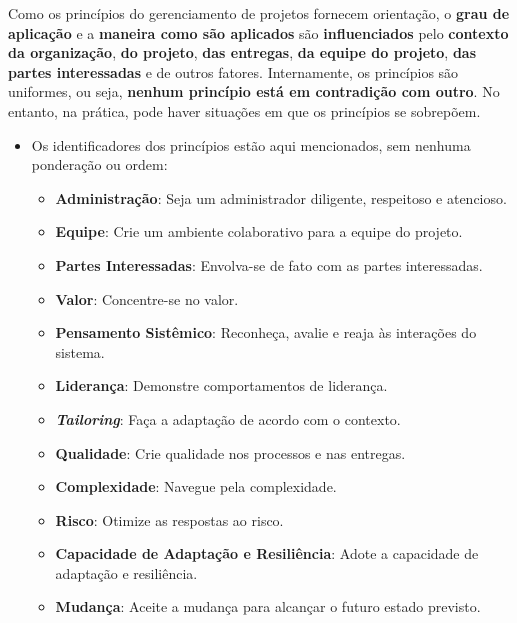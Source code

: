 \documentclass{beamer}
\begin{document}
\begin{frame}
	\justifying
	Como os princípios do gerenciamento de projetos fornecem orientação, o \textbf{grau de aplicação} e a \textbf{maneira como são aplicados} são \textbf{influenciados} pelo \textbf{contexto da organização}, \textbf{do projeto}, \textbf{das entregas}, \textbf{da equipe do projeto}, \textbf{das partes interessadas} e de outros fatores. Internamente, os princípios são uniformes, ou seja, \textbf{nenhum princípio está em contradição com outro}. No entanto, na prática, pode haver situações em que os princípios se sobrepõem.
\end{frame}

\begin{frame}
	\begin{itemize}
		\item Os identificadores dos princípios estão aqui mencionados, sem nenhuma ponderação ou ordem:
			\begin{itemize}
				\justifying
				\item \textbf{Administração}: Seja um administrador diligente, respeitoso e atencioso.
				\item \textbf{Equipe}: Crie um ambiente colaborativo para a equipe do projeto.
				\item \textbf{Partes Interessadas}: Envolva-se de fato com as partes interessadas.
				\item \textbf{Valor}: Concentre-se no valor.
				\item \textbf{Pensamento Sistêmico}: Reconheça, avalie e reaja às interações do sistema.
				\item \textbf{Liderança}: Demonstre comportamentos de liderança.
				\item \textbf{\textit{Tailoring}}: Faça a adaptação de acordo com o contexto.
				\item \textbf{Qualidade}: Crie qualidade nos processos e nas entregas.
				\item \textbf{Complexidade}: Navegue pela complexidade.
				\item \textbf{Risco}: Otimize as respostas ao risco.
				\item \textbf{Capacidade de Adaptação e Resiliência}: Adote a capacidade de adaptação e resiliência.
				\item \textbf{Mudança}: Aceite a mudança para alcançar o futuro estado previsto.
			\end{itemize}
	\end{itemize}
\end{frame}
\end{document}
